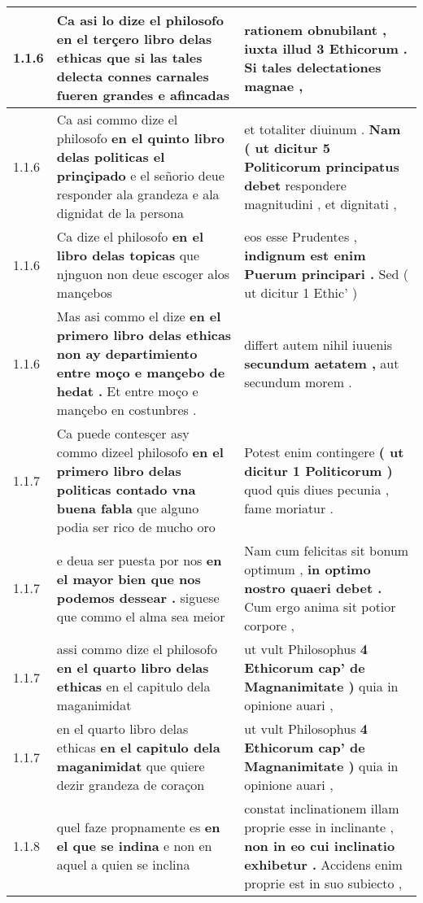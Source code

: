 \begin{tabular}{|p{1cm}|p{6.5cm}|p{6.5cm}|}
1.1.6 & Ca asi lo dize el philosofo \textbf{ en el terçero libro delas ethicas } que si las tales delecta connes carnales fueren grandes e afincadas & rationem obnubilant , \textbf{ iuxta illud 3 Ethicorum . } Si tales delectationes magnae , \\\hline
1.1.6 & Ca asi commo dize el philosofo \textbf{ en el quinto libro delas politicas el prinçipado } e el señorio deue responder ala grandeza e ala dignidat de la persona & et totaliter diuinum . \textbf{ Nam ( ut dicitur 5 Politicorum principatus debet } respondere magnitudini , et dignitati , \\\hline
1.1.6 & Ca dize el philosofo \textbf{ en el libro delas topicas } que njnguon non deue escoger alos mançebos & eos esse Prudentes , \textbf{ indignum est enim Puerum principari . } Sed ( ut dicitur 1 Ethic’ ) \\\hline
1.1.6 & Mas asi commo el dize \textbf{ en el primero libro delas ethicas non ay departimiento entre moço e mançebo de hedat . } Et entre moço e mançebo en costunbres . & differt autem nihil iuuenis \textbf{ secundum aetatem , } aut secundum morem . \\\hline
1.1.7 & Ca puede contesçer asy commo dizeel philosofo \textbf{ en el primero libro delas politicas contado vna buena fabla } que alguno podia ser rico de mucho oro & Potest enim contingere \textbf{ ( ut dicitur 1 Politicorum ) } quod quis diues pecunia , fame moriatur . \\\hline
1.1.7 & e deua ser puesta por nos \textbf{ en el mayor bien que nos podemos dessear . } siguese que commo el alma sea meior & Nam cum felicitas sit bonum optimum , \textbf{ in optimo nostro quaeri debet . } Cum ergo anima sit potior corpore , \\\hline
1.1.7 & assi commo dize el philosofo \textbf{ en el quarto libro delas ethicas } en el capitulo dela maganimidat & ut vult Philosophus \textbf{ 4 Ethicorum cap’ de Magnanimitate ) } quia in opinione auari , \\\hline
1.1.7 & en el quarto libro delas ethicas \textbf{ en el capitulo dela maganimidat } que quiere dezir grandeza de coraçon & ut vult Philosophus \textbf{ 4 Ethicorum cap’ de Magnanimitate ) } quia in opinione auari , \\\hline
1.1.8 & quel faze propnamente es \textbf{ en el que se indina } e non en aquel a quien se inclina & constat inclinationem illam proprie esse in inclinante , \textbf{ non in eo cui inclinatio exhibetur . } Accidens enim proprie est in suo subiecto , \\\hline

\end{tabular}
